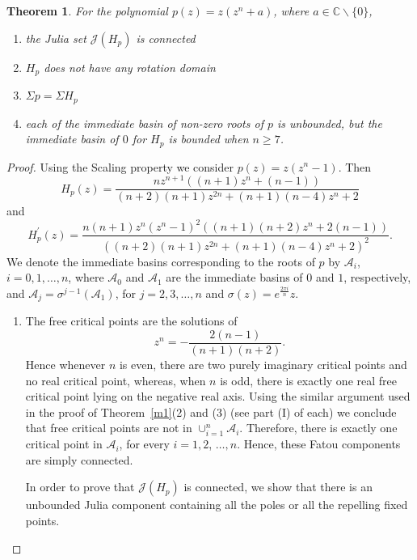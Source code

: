 \documentclass[12pt]{article}
\newtheorem{maintheorem}{Theorem}
\begin{document}
\begin{maintheorem}\label{extn_gen}
For the polynomial $p(z)=z\left(z^{n}+a\right)$, where $a \in \mathbb{C} \backslash\{0\}$,
\begin{enumerate}
	\item the Julia set $ \mathcal{J}(H_p) $ is connected
	\item $H_p$ does not have any rotation domain
	\item $\Sigma p=\Sigma H_ p$
    \item each of the immediate basin of non-zero roots of $p$ is unbounded, but the immediate basin of $ 0 $ for $  H_p $ is bounded when $n\geq 7$.
\end{enumerate}
\end{maintheorem}
\begin{proof}
Using the Scaling property we consider $
p(z)=z(z^{n}-1)$. Then
\begin{equation}
H_{p}(z)=\frac{n z^{n+1}\left((n+1) z^{n}+(n-1)\right)}{(n+2)(n+1) z^{2 n}+(n+1)(n-4) z^{n}+2}\label{H_ext}
\end{equation}
and
$$
H_{p}^{\prime}(z)=\frac{n(n+1) z^{n}\left(z^{n}-1\right)^{2}\left((n+1)(n+2) z^{n}+2(n-1)\right)}{\left((n+2)(n+1) z^{2 n}+(n+1)(n-4) z^{n}+2\right)^{2}}.$$
We denote the immediate basins corresponding to the roots of $p$ by $\mathcal{A}_i$, $i=0,1,\dots, n$, where $\mathcal{A}_0$ and $\mathcal{A}_1$ are the immediate basins of $0$ and $1$, respectively, and $\mathcal{A}_{j}=\sigma^{j-1}(\mathcal{A}_1)$, for $j=2,3,\dots, n$ and $\sigma(z)=e^{\frac{2\pi i}{n}}z$.
\begin{enumerate}
\item The free critical points are the solutions of $$z^{n}=-\frac{2(n-1)}{(n+1)(n+2)}.$$
Hence whenever $n$ is even, there are two purely imaginary critical points and no real critical point, whereas, when $n$ is odd, there is exactly one real free critical point lying on the negative real axis. Using the similar argument used in the proof of Theorem~\ref{m1}(2) and (3) (see part (I) of each) we conclude that free
critical points are not in $\cup_{i=1}^{n} \mathcal{A}_i $. Therefore, there is exactly one critical point in $\mathcal{A}_{i}$, for every $i=1,2$, $\dots, n$. Hence, these Fatou components are simply connected.
\par
In order to prove that $ \mathcal{J} (H_p) $ is connected, we show that there is an unbounded Julia component containing all the poles or all the repelling fixed points.


\end{enumerate}
\end{proof}
\end{document}
